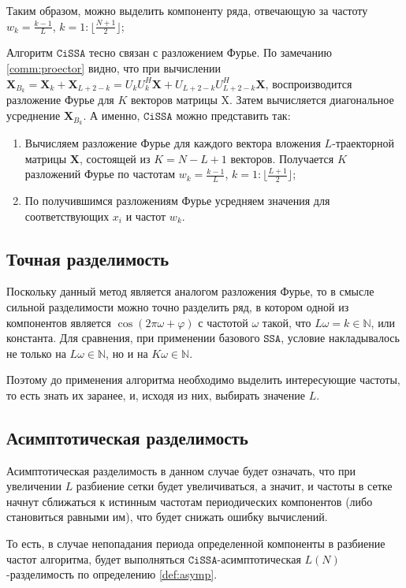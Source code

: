 \documentclass[12pt, specialist, subf
]{disser}
\theoremstyle{definition}
\newcommand{\SSA}{\texttt{SSA}}
\newcommand{\CISSA}{\texttt{CiSSA}}
\begin{document}
Таким образом, можно выделить компоненту ряда, отвечающую за частоту $w_k = \frac{k-1}{L}$, $k = 1:\lfloor \frac{N+1}{2} \rfloor$;

Алгоритм $\CISSA$ тесно связан с разложением Фурье. По замечанию \ref{comm:proector} видно, что при вычислении $\mathbf X_{B_k} = \mathbf X_k + \mathbf X_{L+2-k} = U_k U_k^H \mathbf X + U_{L+2-k} U_{L+2-k}^H \mathbf X$, воспроизводится разложение Фурье для $K$ векторов матрицы $\mathrm X$. Затем вычисляется диагональное усреднение $\mathbf X_{B_k}$. А именно, $\CISSA$ можно представить так:
\begin{enumerate}
	\item Вычисляем разложение Фурье для каждого вектора вложения $L$-траекторной матрицы $\mathbf{X}$, состоящей из $K = N - L + 1$ векторов. Получается $K$ разложений Фурье по частотам $w_k = \frac{k-1}{L}$, $k = 1:\lfloor \frac{L+1}{2} \rfloor$;
	\item По получившимся разложениям Фурье усредняем значения для соответствующих $x_i$ и частот $w_k$.
\end{enumerate}

\subsection{Точная разделимость}
Поскольку данный метод является аналогом разложения Фурье, то в смысле сильной разделимости можно точно разделить ряд, в котором одной из компонентов является $\cos(2\pi \omega + \varphi)$ с частотой $\omega$ такой, что $L\omega = k \in \mathbb N$, или константа. Для сравнения, при применении базового $\SSA$, условие накладывалось не только на $L\omega \in \mathbb N$, но и на $K\omega \in \mathbb N$.

Поэтому до применения алгоритма необходимо выделить интересующие частоты, то есть знать их заранее, и, исходя из них, выбирать значение $L$.

\subsection{Асимптотическая разделимость}
Асимптотическая разделимость в данном случае будет означать, что при увеличении $L$ разбиение сетки будет увеличиваться, а значит, и частоты в сетке начнут сближаться к истинным частотам периодических компонентов (либо становиться равными им), что будет снижать ошибку вычислений.

То есть, в случае непопадания периода определенной компоненты в разбиение частот алгоритма, будет выполняться $\CISSA$-асимптотическая $L(N)$-разделимость по определению \ref{def:asymp}.
\end{document}
